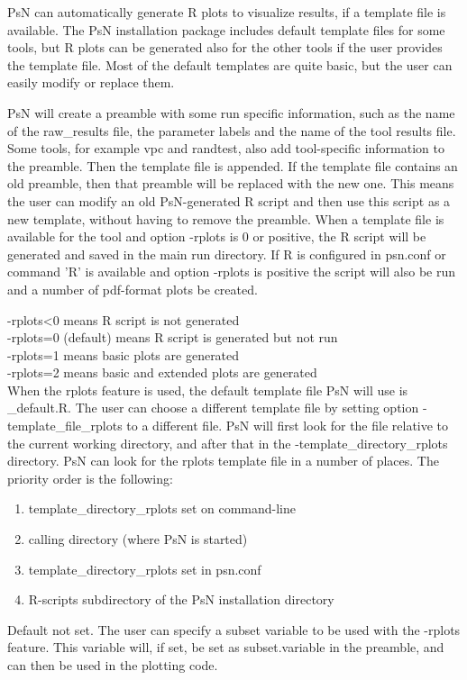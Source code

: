 
PsN can automatically generate R plots to visualize results, 
if a template file is available.
The PsN installation package includes default template files for some
tools, but R plots can be generated also for the other tools
if the user provides the template file.
Most of the default templates are quite basic, but 
the user can easily modify or replace them.

PsN will create a preamble with some run specific information, 
such as the name of the raw\_results file, the parameter labels and the name of
the tool results file. Some tools, for example vpc and randtest, also add
tool-specific information to the preamble. 
Then the template file is appended.
If the template file contains an old preamble, then that preamble will be replaced with 
the new one. This means
the user can modify an old PsN-generated R script and then use this script as a new template,
without having to remove the preamble.
When a template file is available for the tool and option \mbox{-rplots} is 0 or positive, 
the R script will be generated and saved in the main
run directory. 
If R is configured in psn.conf or command 'R' is available and option -rplots is positive 
the script will also be run and a number of pdf-format plots be created.

\rplotsconditions

\begin{optionlist}
-rplots<0 means R script is not generated\\ 
-rplots=0 (default) means R script is generated but not run\\ 
-rplots=1 means basic plots are generated\\													  
-rplots=2 means basic and extended plots are generated\\													  
\nextopt
{}
When the rplots feature is used, the default template file PsN will use is 
\guidetoolname\_default.R. 
The user can choose a different template file
by setting option -template\_file\_rplots to a different file. 
PsN will first look for the file relative to the current working directory, 
and after that in the -template\_directory\_rplots directory.
\nextopt
{}
PsN can look for the rplots template file in a number of places. The priority order is the
following:
\begin{enumerate}
\item template\_directory\_rplots set on command-line 
\item calling directory (where PsN is started)
\item template\_directory\_rplots set in psn.conf 
\item R-scripts subdirectory of the PsN installation directory
\end{enumerate}
\nextopt
{}
Default not set. The user can specify a subset variable to be used with the -rplots feature. 
This variable
will, if set, be set as subset.variable in the preamble,
and can then be used in the plotting code. 
\nextopt
\end{optionlist}

